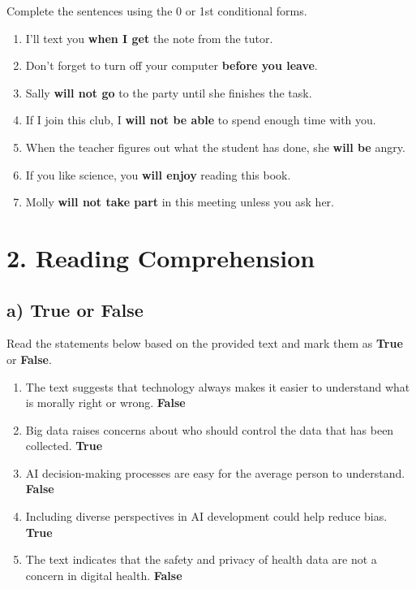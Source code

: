 \documentclass[12pt]{article}
\begin{document}
Complete the sentences using the 0 or 1st conditional forms.

\begin{enumerate}[label=\textbf{01.}]
    \item I’ll text you \textbf{when I get} the note from the tutor.
    \item Don’t forget to turn off your computer \textbf{before you leave}.
    \item Sally \textbf{will not go} to the party until she finishes the task.
    \item If I join this club, I \textbf{will not be able} to spend enough time with you.
    \item When the teacher figures out what the student has done, she \textbf{will be} angry.
    \item If you like science, you \textbf{will enjoy} reading this book.
    \item Molly \textbf{will not take part} in this meeting unless you ask her.
\end{enumerate}

\section*{2. Reading Comprehension}

\subsection*{a) True or False}

Read the statements below based on the provided text and mark them as \textbf{True} or \textbf{False}.

\begin{enumerate}
    \item The text suggests that technology always makes it easier to understand what is morally right or wrong. \hfill \textbf{False}
    \item Big data raises concerns about who should control the data that has been collected. \hfill \textbf{True}
    \item AI decision-making processes are easy for the average person to understand. \hfill \textbf{False}
    \item Including diverse perspectives in AI development could help reduce bias. \hfill \textbf{True}
    \item The text indicates that the safety and privacy of health data are not a concern in digital health. \hfill \textbf{False}
\end{enumerate}
\end{document}
